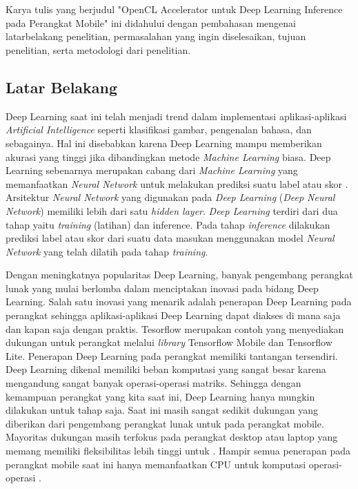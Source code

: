 \chapter{\babSatu}
Karya tulis yang berjudul "OpenCL Accelerator untuk Deep Learning Inference pada Perangkat Mobile" ini didahului dengan pembahasan mengenai latarbelakang penelitian, permasalahan yang ingin diselesaikan, tujuan penelitian, serta metodologi dari penelitian.

\section{Latar Belakang}
Deep Learning saat ini telah menjadi trend dalam implementasi aplikasi-aplikasi \textit{Artificial Intelligence} seperti klasifikasi gambar, pengenalan bahasa, dan sebagainya. Hal ini disebabkan karena Deep Learning mampu memberikan akurasi yang tinggi jika dibandingkan metode \textit{Machine Learning} biasa. Deep Learning sebenarnya merupakan cabang dari \textit{Machine Learning} yang memanfaatkan \textit{Neural Network} untuk melakukan prediksi suatu label atau skor \cite{deeplearning}. Arsitektur \textit{Neural Network} yang digunakan pada \textit{Deep Learning} (\textit{Deep Neural Network}) memiliki lebih dari satu \textit{hidden layer}. \textit{Deep Learning} terdiri dari dua tahap yaitu \textit{training} (latihan) dan inference. Pada tahap \textit{inference} dilakukan prediksi label atau skor dari suatu data masukan menggunakan model \textit{Neural Network} yang telah dilatih pada tahap \textit{training}.

Dengan meningkatnya popularitas Deep Learning, banyak pengembang perangkat lunak yang mulai berlomba dalam menciptakan inovasi pada bidang Deep Learning. Salah satu inovasi yang menarik adalah penerapan Deep Learning pada perangkat \mobile sehingga aplikasi-aplikasi Deep Learning dapat diakses di mana saja dan kapan saja dengan praktis. Tesorflow \cite{tensorflow} merupakan contoh \deeplearning \framework yang menyediakan dukungan untuk perangkat \mobile melalui \textit{library} Tensorflow Mobile dan Tensorflow Lite. Penerapan Deep Learning pada perangkat \mobile memiliki tantangan tersendiri. Deep Learning dikenal memiliki beban komputasi yang sangat besar karena mengandung sangat banyak operasi-operasi matriks. Sehingga dengan kemampuan perangkat \mobile yang kita saat ini, Deep Learning hanya mungkin dilakukan untuk tahap \inference saja. Saat ini masih sangat sedikit dukungan yang diberikan dari pengembang perangkat lunak untuk \deeplearning \inference pada perangkat mobile. Mayoritas dukungan masih terfokus pada perangkat desktop atau laptop yang memang memiliki fleksibilitas lebih tinggi untuk \deeplearning. Hampir semua penerapan \deeplearning pada perangkat mobile saat ini hanya memanfaatkan CPU untuk komputasi operasi-operasi \inference.

